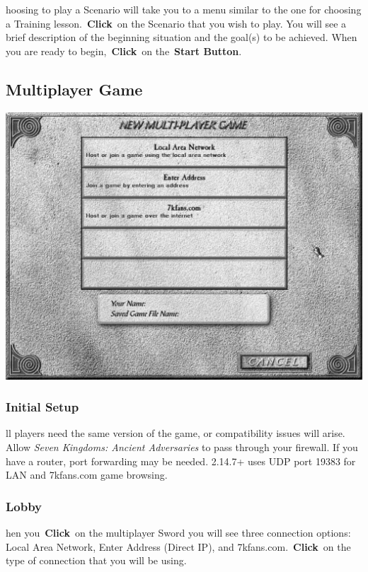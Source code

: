 hoosing to play a Scenario will take you to a menu similar to the one for choosing a Training lesson. \textbf{Click} on the Scenario that you wish to play. You will see a brief description of the beginning situation and the goal(s) to be achieved. When you are ready to begin, \textbf{Click} on the \textbf{Start Button}.

\subsection{Multiplayer Game}


\begin{center}
	\includegraphics[width=0.7\linewidth]{Imultiplayer}
\end{center}

\subsubsection{Initial Setup}


ll players need the same version of the game, or compatibility issues will arise. Allow \textit{Seven Kingdoms: Ancient Adversaries} to pass through your firewall. If you have a router, port forwarding may be needed. 2.14.7+ uses UDP port 19383 for LAN and 7kfans.com game browsing.

\subsubsection{Lobby}

hen you \textbf{Click} on the multiplayer Sword you will see three connection options: Local Area Network, Enter Address (Direct IP), and 7kfans.com. \textbf{Click} on the type of connection that you will be using.

